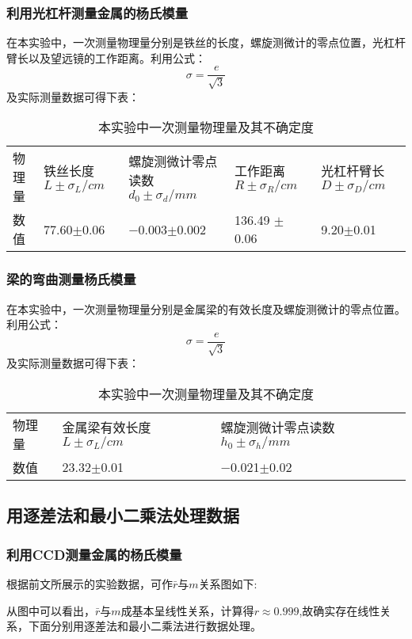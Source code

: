 \documentclass{ctexart}
\begin{document}
\subsubsection{利用光杠杆测量金属的杨氏模量}
在本实验中，一次测量物理量分别是铁丝的长度，螺旋测微计的零点位置，光杠杆臂长以及望远镜的工作距离。利用公式：
$$\sigma=\frac{e}{\sqrt{3}}$$
及实际测量数据可得下表：
\begin{table}[H]
  \centering
  \caption{本实验中一次测量物理量及其不确定度}
  \resizebox{\textwidth}{!}
  {
    \begin{tabular}{lllll}
    物理量   & 铁丝长度$L \pm \sigma_L /cm$ & 螺旋测微计零点读数$d_0 \pm \sigma_d /mm$ & 工作距离$R \pm \sigma_R /cm $ & 光杠杆臂长$D \pm \sigma_D /cm$ \\
    数值    & 77.60$\pm$0.06 & $-$0.003$\pm$0.002 & 136.49 $\pm$ 0.06 & 9.20$\pm$0.01 \\
    \end{tabular}%
  }
  \label{tab:addlabel}%
\end{table}%
\subsubsection{梁的弯曲测量杨氏模量}
在本实验中，一次测量物理量分别是金属梁的有效长度及螺旋测微计的零点位置。利用公式：
$$\sigma=\frac{e}{\sqrt{3}}$$
及实际测量数据可得下表：
\begin{table}[H]
  \centering
  \caption{本实验中一次测量物理量及其不确定度}
    \begin{tabular}{lll}
    物理量   & 金属梁有效长度$L\pm \sigma_L/cm$ & 螺旋测微计零点读数$h_0 \pm \sigma_h /mm$ \\
    数值    & 23.32$\pm$0.01 & $-$0.021$\pm$0.02 \\
    \end{tabular}%
  \label{tab:addlabel}%
\end{table}%
\subsection{用逐差法和最小二乘法处理数据}
\subsubsection{利用CCD测量金属的杨氏模量}
根据前文所展示的实验数据，可作$\bar{r}$与$m$关系图如下:

从图中可以看出，$\bar{r}$与$m$成基本呈线性关系，计算得$r\approx 0.999$,故确实存在线性关系，下面分别用逐差法和最小二乘法进行数据处理。
\end{document}
